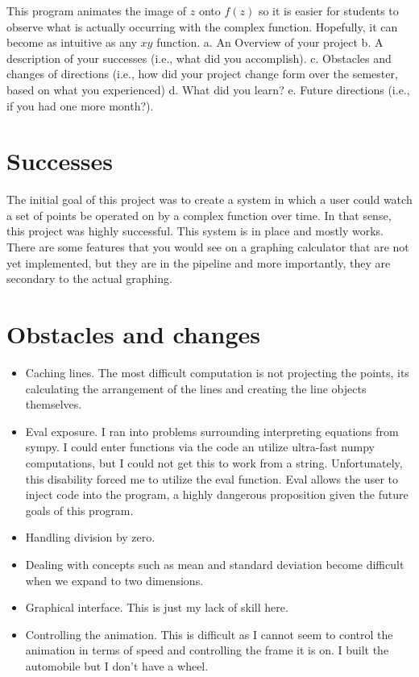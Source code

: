 \documentclass{article}
\begin{document}
    This program animates the image of $z$ onto $f(z)$ so it is easier for students to observe what is actually occurring with the complex function. Hopefully, it can become as intuitive as any $xy$ function.
    a.  An Overview of your project
    b.  A description of your successes (i.e., what did you accomplish).
    c.  Obstacles and changes of directions (i.e., how did your project change form over the semester, based on what you experienced)
    d.  What did you learn?  
    e.  Future directions (i.e., if you had one more month?).
\section{Successes}
    The initial goal of this project was to create a system in which a user could watch a set of points be operated on by a complex function over time. In that sense, this project was highly successful. This system is in place and mostly works. There are some features that you would see on a graphing calculator that are not yet implemented, but they are in the pipeline and more importantly, they are secondary to the actual graphing.
\section{Obstacles and changes}
    \begin{itemize}
        \item Caching lines. The most difficult computation is not projecting the points, its calculating the arrangement of the lines and creating the line objects themselves.
        \item Eval exposure. I ran into problems surrounding interpreting equations from sympy. I could enter functions via the code an utilize ultra-fast numpy computations, but I could not get this to work from a string. Unfortunately, this disability forced me to utilize the eval function. Eval allows the user to inject code into the program, a highly dangerous proposition given the future goals of this program.
        \item Handling division by zero.
        \item Dealing with concepts such as mean and standard deviation become difficult when we expand to two dimensions.
        \item Graphical interface. This is just my lack of skill here.
        \item Controlling the animation. This is difficult as I cannot seem to control the animation in terms of speed and controlling the frame it is on. I built the automobile but I don't have a wheel.
    \end{itemize}
\end{document}

